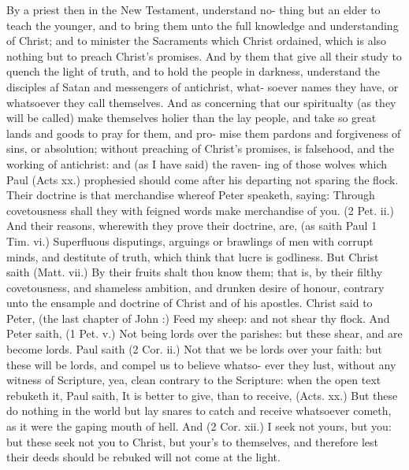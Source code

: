 \documentclass{custom}
\begin{document}
By a priest then in the New Testament, understand no- 
thing but an elder to teach the younger, and to bring 
them unto the full knowledge and understanding of Christ; 
and to minister the Sacraments which Christ ordained, 
which is also nothing but to preach Christ's promises. 
And by them that give all their study to quench the light 
of truth, and to hold the people in darkness, understand 
the disciples af Satan and messengers of antichrist, what- 
soever names they have, or whatsoever they call themselves. 
And as concerning that our spiritualty (as they will be
called) make themselves holier than the lay people, and 
take so great lands and goods to pray for them, and pro-
mise them pardons and forgiveness of sins, or absolution; 
without preaching of Christ's promises, is falsehood, and 
the working of antichrist: and (as I have said) the raven-
ing of those wolves which Paul (Acts xx.) prophesied 
should come after his departing not sparing the flock. 
Their doctrine is that merchandise whereof Peter speaketh,
saying: Through covetousness shall they with feigned words 
make merchandise of you. (2 Pet. ii.) And their reasons,
wherewith they prove their doctrine, are, (as saith Paul 
1 Tim. vi.) Superfluous disputings, arguings or brawlings of 
men with corrupt minds, and destitute of truth, which 
think that lucre is godliness. But Christ saith (Matt. vii.) 
By their fruits shalt thou know them; that is, by their 
filthy covetousness, and shameless ambition, and drunken 
desire of honour, contrary unto the ensample and doctrine 
of Christ and of his apostles. Christ said to Peter, (the 
last chapter of John :) Feed my sheep: and not shear thy 
flock. And Peter saith, (1 Pet. v.) Not being lords over 
the parishes: but these shear, and are become lords. Paul 
saith (2 Cor. ii.) Not that we be lords over your faith: 
but these will be lords, and compel us to believe whatso- 
ever they lust, without any witness of Scripture, yea, clean 
contrary to the Scripture: when the open text rebuketh it, 
Paul saith, It is better to give, than to receive, (Acts. xx.) 
But these do nothing in the world but lay snares to catch 
and receive whatsoever cometh, as it were the gaping 
mouth of hell. And (2 Cor. xii.) I seek not yours, but you: 
but these seek not you to Christ, but your's to themselves, 
and therefore lest their deeds should be rebuked will not 
come at the light. 
\end{document}
